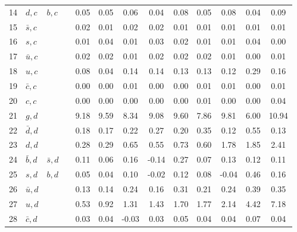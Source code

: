 \begin{tabularx}{\textwidth}{rXXX@{}S@{}S@{}S@{}S@{}S@{}S@{}S@{}S@{}S}
 14 & $d, c$           & $b, c$            &                  &  0.05 &  0.05 &  0.06 &  0.04 &  0.08 &  0.05 &  0.08 &  0.04 &  0.09 \\
 15 & $\bar s, c$      &                   &                  &  0.02 &  0.01 &  0.02 &  0.02 &  0.01 &  0.01 &  0.01 &  0.01 &  0.01 \\
 16 & $s, c$           &                   &                  &  0.01 &  0.04 &  0.01 &  0.03 &  0.02 &  0.01 &  0.01 &  0.04 &  0.00 \\
 17 & $\bar u, c$      &                   &                  &  0.02 &  0.02 &  0.01 &  0.02 &  0.02 &  0.02 &  0.01 &  0.00 &  0.01 \\
 18 & $u, c$           &                   &                  &  0.08 &  0.04 &  0.14 &  0.14 &  0.13 &  0.13 &  0.12 &  0.29 &  0.16 \\
 19 & $\bar c, c$      &                   &                  &  0.00 &  0.00 &  0.01 &  0.00 &  0.00 &  0.01 &  0.01 &  0.00 &  0.01 \\
 20 & $c, c$           &                   &                  &  0.00 &  0.00 &  0.00 &  0.00 &  0.00 &  0.01 &  0.00 &  0.00 &  0.04 \\
 21 & $g, d$           &                   &                  &  9.18 &  9.59 &  8.34 &  9.08 &  9.60 &  7.86 &  9.81 &  6.00 & 10.94 \\
 22 & $\bar d, d$      &                   &                  &  0.18 &  0.17 &  0.22 &  0.27 &  0.20 &  0.35 &  0.12 &  0.55 &  0.13 \\
 23 & $d, d$           &                   &                  &  0.28 &  0.29 &  0.65 &  0.55 &  0.73 &  0.60 &  1.78 &  1.85 &  2.41 \\
 24 & $\bar b, d$      & $\bar s, d$       &                  &  0.11 &  0.06 &  0.16 & -0.14 &  0.27 &  0.07 &  0.13 &  0.12 &  0.11 \\
 25 & $s, d$           & $b, d$            &                  &  0.05 &  0.04 &  0.10 & -0.02 &  0.12 &  0.08 & -0.04 &  0.46 &  0.16 \\
 26 & $\bar u, d$      &                   &                  &  0.13 &  0.14 &  0.24 &  0.16 &  0.31 &  0.21 &  0.24 &  0.39 &  0.35 \\
 27 & $u, d$           &                   &                  &  0.53 &  0.92 &  1.31 &  1.43 &  1.70 &  1.77 &  2.14 &  4.42 &  7.18 \\
 28 & $\bar c, d$      &                   &                  &  0.03 &  0.04 & -0.03 &  0.03 &  0.05 &  0.04 &  0.04 &  0.07 &  0.04 \\

\end{tabularx}
